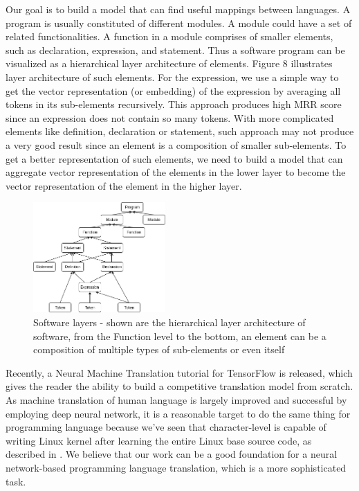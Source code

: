 Our goal is to build a model that can find useful mappings between languages. A program is usually constituted of different modules. A module could have a set of related functionalities. A function in a module comprises of smaller elements, such as declaration, expression, and statement. Thus a software program can be visualized as a hierarchical layer architecture of elements. Figure 8 illustrates layer architecture of such elements. For the expression, we use a simple way to get the vector representation (or embedding) of the expression by averaging all tokens in its sub-elements recursively. This approach produces high MRR score since an expression does not contain so many tokens. With more complicated elements like definition, declaration or statement, such approach may not produce a very good result since an element is a composition of smaller sub-elements. To get a better representation of such elements, we need to build a model that can aggregate vector representation of the elements in the lower layer to become the vector representation of the element in the higher layer. 

\begin{figure}[t!]
	\includegraphics[width=0.45\textwidth]{software_layers}
	\caption{Software layers - shown are the hierarchical layer architecture of software, from the Function level to the bottom, an element can be a composition of multiple types of sub-elements or even itself}
	\medskip
	\label{fig:clf}
\end{figure}

Recently, a Neural Machine Translation tutorial \cite{Thang} for TensorFlow is released, which gives the reader the ability to build a competitive translation model from scratch. As machine translation of human language is largely improved and successful by employing deep neural network, it is a reasonable target to do the same thing for programming language because we've seen that character-level is capable of writing Linux kernel after learning the entire Linux base source code, as described in \cite{Karpathy}. We believe that our work can be a good foundation for a neural network-based programming language translation, which is a more sophisticated task. 


